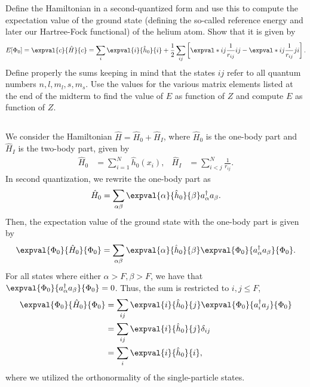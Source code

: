 Define the Hamiltonian in a second-quantized form and use this to compute the expectation value of the ground state (defining the so-called reference energy and later our Hartree-Fock functional) of
the helium atom.
Show that it is given by
\begin{equation}
    E[\Phi_0] = \expval{c}{\hat{H}}{c} = \sum_{i} \expval{i}{\hat{h}_0}{i} + \frac{1}{2} \sum_{ij} \left[\expval*{ij}{\frac{1}{r_{ij}}}{ij} - \expval*{ij}{\frac{1}{r_{ij}}}{ji}\right].
\end{equation}
Define properly the sums keeping in mind that the states $ij$ refer to all quantum numbers $n, l, m_l, s, m_s$.
Use the values for the various matrix elements listed at the end of the midterm to find the value of $E$ as function of $Z$ and compute $E$ as function of $Z$.

\subsection{}
We consider the Hamiltonian $\hat{H} = \hat{H}_0 + \hat{H}_I$, where $\hat{H}_0$ is the one-body part and $\hat{H}_I$ is the two-body part, given by
\begin{align*}
    \hat{H}_0 &= \sum_{i=1}^{N}\hat{h}_0(x_i), &
    \hat{H}_I &= \sum_{i<j}^{N}\frac{1}{r_{ij}}.
\end{align*}
In second quantization, we rewrite the one-body part as
\begin{equation}
    \hat{H}_0 = \sum_{\alpha\beta} \expval{\alpha}{\hat{h}_0}{\beta} a_\alpha^\dagger a_\beta.
\end{equation}
Then, the expectation value of the ground state with the one-body part is given by
\begin{equation*}
    \expval{\Phi_0}{\hat{H}_0}{\Phi_0} = \sum_{\alpha\beta} \expval{\alpha}{\hat{h}_0}{\beta} \expval{\Phi_0}{a_\alpha^\dagger a_\beta}{\Phi_0}.
\end{equation*}
For all states where either $\alpha > F, \beta > F$, we have that $\expval{\Phi_0}{a_\alpha^\dagger a_\beta}{\Phi_0} = 0$.
Thus, the sum is restricted to $i,j \le F$,
\begin{align*}
    \expval{\Phi_0}{\hat{H}_0}{\Phi_0} &= \sum_{ij} \expval{i}{\hat{h}_0}{j} \expval{\Phi_0}{a_i^\dagger a_j}{\Phi_0} \\
    &= \sum_{ij} \expval{i}{\hat{h}_0}{j} \delta_{ij} \\
    &= \sum_{i} \expval{i}{\hat{h}_0}{i},
\end{align*}
where we utilized the orthonormality of the single-particle states.

